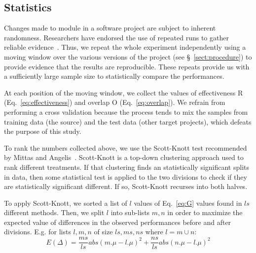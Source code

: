 \documentclass[sigconf, proceedings, 9pt]{acmart}
\newcommand{\tion}[1]{\S~\ref{sect:#1}}
\newcommand{\eq}[1]{Eq.~\ref{eq:#1}}
\begin{document}
\subsection{Statistics}
\label{sect:stats}
Changes made to module in a software project are subject to inherent 
randomness. Researchers have endorsed the use of repeated runs 
to gather reliable evidence~\cite{vaux2012replicates}. Thus, we repeat the 
whole experiment independently using a moving window over 
the various versions  of the project (see \tion{procedure}) to provide evidence 
that the results are reproducible. These repeats provide us with a sufficiently 
large sample size to statistically compare the performances. 

At each position of the moving window, we collect the values of effectiveness R 
(\eq{effectiveness})
and overlap O (\eq{overlap}). We refrain from 
performing a cross validation because the process tends to mix the samples 
from training data (the source) and the test data (other target 
projects), which defeats the purpose of this study.

To rank the numbers collected above, we use the Scott-Knott test 
recommended by Mittas and Angelis~\cite{mittas13}. Scott-Knott is a 
top-down clustering approach used to rank different treatments. If that 
clustering finds an statistically significant splits in data, then some 
statistical test is applied to the two divisions to check if they are 
statistically significant different. If so, Scott-Knott recurses into both 
halves.

To  apply Scott-Knott, we sorted a list of  $l$ values of \eq{G} 
values found in $ls$ different methods. Then, we split $l$ into 
sub-lists $m,n$ in order to maximize the expected value of differences in 
the observed performances before and after divisions. E.g. for lists 
$l,m,n$ of size $ls,ms,ns$ where $l=m\cup n$: 
\[E(\Delta)=\frac{ms}{ls}abs(m.\mu - l.\mu)^2 + \frac{ns}{ls}abs(n.\mu - 
l.\mu)^2\] 
\end{document}
